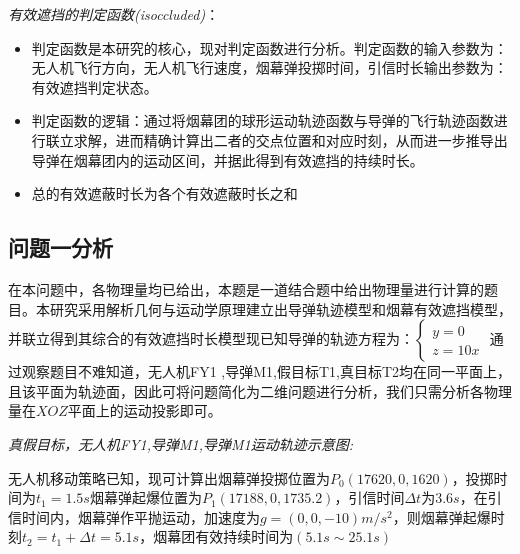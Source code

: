 \documentclass{article}
\begin{document}
\textit{有效遮挡的判定函数(isoccluded)}：
\begin{itemize}
    \item 判定函数是本研究的核心，现对判定函数进行分析。判定函数的输入参数为：无人机飞行方向，无人机飞行速度，烟幕弹投掷时间，引信时长输出参数为：有效遮挡判定状态。
    \item 判定函数的逻辑：通过将烟幕团的球形运动轨迹函数与导弹的飞行轨迹函数进行联立求解，进而精确计算出二者的交点位置和对应时刻，从而进一步推导出导弹在烟幕团内的运动区间，并据此得到有效遮挡的持续时长。
    \item 总的有效遮蔽时长为各个有效遮蔽时长之和
\end{itemize}
\subsection{问题一分析}
在本问题中，各物理量均已给出，本题是一道结合题中给出物理量进行计算的题目。本研究采用解析几何与运动学原理建立出导弹轨迹模型和烟幕有效遮挡模型，并联立得到其综合的有效遮挡时长模型现已知导弹的轨迹方程为：$\begin{cases}
    y = 0 \\
    z = 10x
\end{cases}$
通过观察题目不难知道，无人机FY1 ,导弹M1,假目标T1,真目标T2均在同一平面上，且该平面为轨迹面，因此可将问题简化为二维问题进行分析，我们只需分析各物理量在$XOZ$平面上的运动投影即可。

\textit{真假目标，无人机FY1,导弹M1,导弹M1运动轨迹示意图:}


无人机移动策略已知，现可计算出烟幕弹投掷位置为$P_0(17620,0,1620)$，投掷时间为$t_1 = 1.5s$烟幕弹起爆位置为$P_1(17188,0,1735.2)$，引信时间$\Delta t$为$3.6s$，在引信时间内，烟幕弹作平抛运动，加速度为$g = (0,0,-10)$$m/s^2$，则烟幕弹起爆时刻$t_2 = t_1 + \Delta t = 5.1s$，烟幕团有效持续时间为$(5.1s \sim25.1s)$
\end{document}
